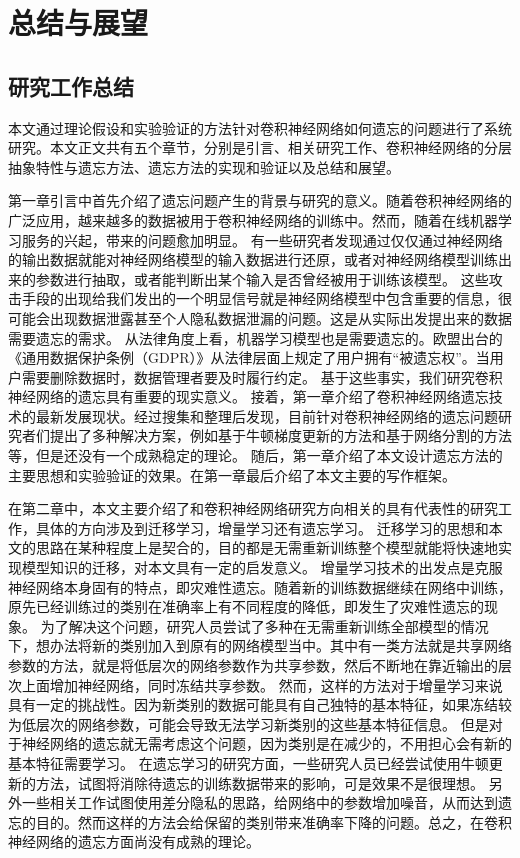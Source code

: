 
\chapter{总结与展望}

\section{研究工作总结}

本文通过理论假设和实验验证的方法针对卷积神经网络如何遗忘的问题进行了系统研究。本文正文共有五个章节，分别是引言、相关研究工作、卷积神经网络的分层抽象特性与遗忘方法、遗忘方法的实现和验证以及总结和展望。

第一章引言中首先介绍了遗忘问题产生的背景与研究的意义。随着卷积神经网络的广泛应用，越来越多的数据被用于卷积神经网络的训练中。然而，随着在线机器学习服务的兴起，带来的问题愈加明显。
有一些研究者发现通过仅仅通过神经网络的输出数据就能对神经网络模型的输入数据进行还原，或者对神经网络模型训练出来的参数进行抽取，或者能判断出某个输入是否曾经被用于训练该模型。
这些攻击手段的出现给我们发出的一个明显信号就是神经网络模型中包含重要的信息，很可能会出现数据泄露甚至个人隐私数据泄漏的问题。这是从实际出发提出来的数据需要遗忘的需求。
从法律角度上看，机器学习模型也是需要遗忘的。欧盟出台的《通用数据保护条例（GDPR）》从法律层面上规定了用户拥有“被遗忘权”。当用户需要删除数据时，数据管理者要及时履行约定。
基于这些事实，我们研究卷积神经网络的遗忘具有重要的现实意义。
接着，第一章介绍了卷积神经网络遗忘技术的最新发展现状。经过搜集和整理后发现，目前针对卷积神经网络的遗忘问题研究者们提出了多种解决方案，例如基于牛顿梯度更新的方法和基于网络分割的方法等，但是还没有一个成熟稳定的理论。
随后，第一章介绍了本文设计遗忘方法的主要思想和实验验证的效果。在第一章最后介绍了本文主要的写作框架。

在第二章中，本文主要介绍了和卷积神经网络研究方向相关的具有代表性的研究工作，具体的方向涉及到迁移学习，增量学习还有遗忘学习。
迁移学习的思想和本文的思路在某种程度上是契合的，目的都是无需重新训练整个模型就能将快速地实现模型知识的迁移，对本文具有一定的启发意义。
增量学习技术的出发点是克服神经网络本身固有的特点，即灾难性遗忘。随着新的训练数据继续在网络中训练，原先已经训练过的类别在准确率上有不同程度的降低，即发生了灾难性遗忘的现象。
为了解决这个问题，研究人员尝试了多种在无需重新训练全部模型的情况下，想办法将新的类别加入到原有的网络模型当中。其中有一类方法就是共享网络参数的方法，就是将低层次的网络参数作为共享参数，然后不断地在靠近输出的层次上面增加神经网络，同时冻结共享参数。
然而，这样的方法对于增量学习来说具有一定的挑战性。因为新类别的数据可能具有自己独特的基本特征，如果冻结较为低层次的网络参数，可能会导致无法学习新类别的这些基本特征信息。
但是对于神经网络的遗忘就无需考虑这个问题，因为类别是在减少的，不用担心会有新的基本特征需要学习。
在遗忘学习的研究方面，一些研究人员已经尝试使用牛顿更新的方法，试图将消除待遗忘的训练数据带来的影响，可是效果不是很理想。
另外一些相关工作试图使用差分隐私的思路，给网络中的参数增加噪音，从而达到遗忘的目的。然而这样的方法会给保留的类别带来准确率下降的问题。总之，在卷积神经网络的遗忘方面尚没有成熟的理论。

